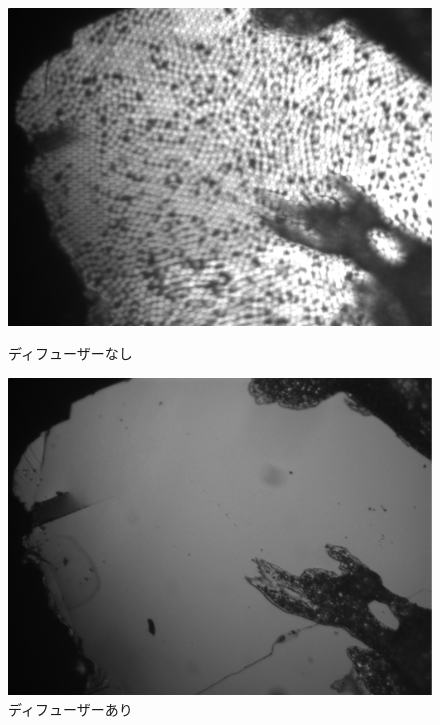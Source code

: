 \begin{figure}[!h]
 \begin{minipage}{0.5\hsize}
  \begin{center}
   \includegraphics[width=\hsize]{optics_microscopy/without_diffuser.eps}
  \end{center}
  \caption{ディフューザーなし}
  \label{fig:without_diffuser}
 \end{minipage}
 \begin{minipage}{0.5\hsize}
  \begin{center}
   \includegraphics[width=\hsize]{optics_microscopy/with_diffuser.eps}
  \end{center}
  \caption{ディフューザーあり}
  \label{fig:with_diffuser}
 \end{minipage}
\end{figure}

